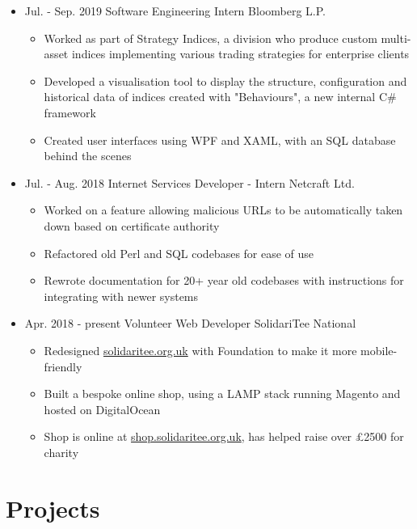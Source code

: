 \documentclass[11pt,a4paper,sans]{moderncv}        %
\begin{document}
\begin{itemize}

\item{
\cventry
{Jul. - Sep. 2019}
{Software Engineering Intern}
{Bloomberg L.P.}
{}{}{
\begin{itemize}
\item Worked as part of Strategy Indices, a division who produce custom multi-asset indices implementing various trading strategies for enterprise clients
\item Developed a visualisation tool to display the structure, configuration and historical data of indices created with "Behaviours", a new internal C\# framework
\item Created user interfaces using WPF and XAML, with an SQL database behind the scenes
\end{itemize}
}}

\item{
\cventry
{Jul. - Aug. 2018}
{Internet Services Developer - Intern}
{Netcraft Ltd.}
{}{}{
\begin{itemize}
\item Worked on a feature allowing malicious URLs to be automatically taken down based on certificate authority
\item Refactored old Perl and SQL codebases for ease of use
\item Rewrote documentation for 20+ year old codebases with instructions for integrating with newer systems
\end{itemize}
}}

\item{
\cventry
{Apr. 2018 - present}
{Volunteer Web Developer}
{SolidariTee National}
{}{}{
\begin{itemize}
\item Redesigned \href{https://www.solidaritee.org.uk/}{solidaritee.org.uk} with Foundation to make it more mobile-friendly
\item Built a bespoke online shop, using a LAMP stack running Magento and hosted on DigitalOcean
\item Shop is online at \href{https://shop.solidaritee.org.uk/}{shop.solidaritee.org.uk}, has helped raise over £2500 for charity
\end{itemize}
}}

\end{itemize}

\section{Projects}
\end{document}
